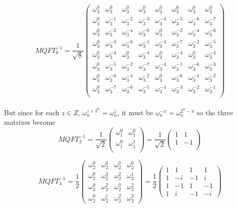 \documentclass{article}
\begin{document}
\[
MQFT_8^{-1} = \frac{1}{\sqrt{8}} \begin{pmatrix} 
\omega_3^{0}  & \omega_3^{0}  & \omega_3^{0}  & \omega_3^{0}  & \omega_3^{0}  & \omega_3^{0}  & \omega_3^{0}  & \omega_3^{0} \\ 
\omega_3^{0}  & \omega_3^{-1}  & \omega_3^{-2}  & \omega_3^{-3}  & \omega_3^{-4}  & \omega_3^{-5}  & \omega_3^{-6}  & \omega_3^{-7} \\ 
\omega_3^{0}  & \omega_3^{-2}  & \omega_3^{-4}  & \omega_3^{-6}  & \omega_3^{0}  & \omega_3^{-2}  & \omega_3^{-4}  & \omega_3^{-6} \\ 
\omega_3^{0}  & \omega_3^{-3}  & \omega_3^{-6}  & \omega_3^{-1}  & \omega_3^{-4}  & \omega_3^{-7}  & \omega_3^{-2}  & \omega_3^{-5} \\
\omega_3^{0}  & \omega_3^{-4}  & \omega_3^{0}  & \omega_3^{-4}  & \omega_3^{0}  & \omega_3^{-4}  & \omega_3^{0}  & \omega_3^{-4} \\ 
\omega_3^{0}  & \omega_3^{-5}  & \omega_3^{-2}  & \omega_3^{-7}  & \omega_3^{-4}  & \omega_3^{-1}  & \omega_3^{-6}  & \omega_3^{-3} \\ 
\omega_3^{0}  & \omega_3^{-6}  & \omega_3^{-4}  & \omega_3^{-2}  & \omega_3^{0}  & \omega_3^{-6}  & \omega_3^{-4}  & \omega_3^{-2} \\ 
\omega_3^{0}  & \omega_3^{-7}  & \omega_3^{-6}  & \omega_3^{-5}  & \omega_3^{-4}  & \omega_3^{-3}  & \omega_3^{-2}  & \omega_3^{-1} \\ 
\end{pmatrix} \]
\\
But since for each $z \in Z$, $\omega_n^{z + {2^n}} = \omega_n^z$, it must be $\omega_n^{-x} = \omega_n^{2^n - x}$ so the three matrixes become
\\
\[MQFT_2^{-1} = 
\frac{1}{\sqrt{2}} \begin{pmatrix} 
\omega_1^{0}  & \omega_1^{0} \\ 
\omega_1^{0}  & \omega_1^{1} \\ 
\end{pmatrix} = 
\frac{1}{\sqrt{2}} \begin{pmatrix} 
1  & 1 \\ 
1  & -1 \\ 
\end{pmatrix}
\]


\[MQFT_4^{-1} =  
\frac{1}{2} \begin{pmatrix} 
\omega_2^{0}  & \omega_2^{0}  & \omega_2^{0}  & \omega_2^{0} \\ 
\omega_2^{0}  & \omega_2^{3}  & \omega_2^{2}  & \omega_2^{1} \\ 
\omega_2^{0}  & \omega_2^{2}  & \omega_2^{0}  & \omega_2^{2} \\ 
\omega_2^{0}  & \omega_2^{1}  & \omega_2^{2}  & \omega_2^{3}
\end{pmatrix} = \frac{1}{2} \begin{pmatrix} 
1  & 1  & 1  & 1 \\ 
1  & -i  & -1  & i \\ 
1  & -1  & 1  & -1 \\ 
1  & i  & -1  & -i
\end{pmatrix} \]
\end{document}
